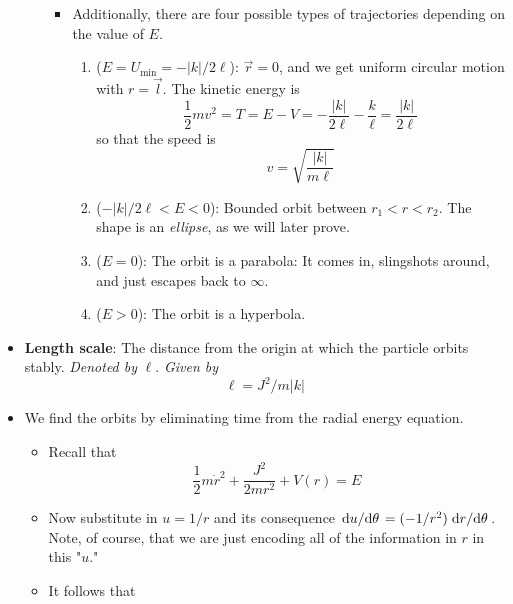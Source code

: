\documentclass[../notes.tex]{subfiles}
\begin{document}
\begin{itemize}
\begin{itemize}
\begin{itemize}
            \item Additionally, there are four possible types of trajectories depending on the value of $E$.
            \begin{enumerate}
                \item ($E=U_\text{min}=-|k|/2\ell$): $\vec{r}=0$, and we get uniform circular motion with $r=\vec{l}$. The kinetic energy is
                \begin{equation*}
                    \frac{1}{2}mv^2 = T
                    = E-V
                    = -\frac{|k|}{2\ell}-\frac{k}{\ell}
                    = \frac{|k|}{2\ell}
                \end{equation*}
                so that the speed is
                \begin{equation*}
                    v = \sqrt{\frac{|k|}{m\ell}}
                \end{equation*}
                \item ($-|k|/2\ell<E<0$): Bounded orbit between $r_1<r<r_2$. The shape is an \emph{ellipse}, as we will later prove.
                \item ($E=0$): The orbit is a parabola: It comes in, slingshots around, and just escapes back to $\infty$.
                \item ($E>0$): The orbit is a hyperbola.
            \end{enumerate}
        \end{itemize}
    \end{itemize}
    \item \textbf{Length scale}: The distance from the origin at which the particle orbits stably. \emph{Denoted by} $\bm{\ell}$. \emph{Given by}
    \begin{equation*}
        \ell = J^2/m|k|
    \end{equation*}
    \item We find the orbits by eliminating time from the radial energy equation.
    \begin{itemize}
        \item Recall that
        \begin{equation*}
            \frac{1}{2}m\dot{r}^2+\frac{J^2}{2mr^2}+V(r) = E
        \end{equation*}
        \item Now substitute in $u=1/r$ and its consequence $\dv*{u}{\theta}=(-1/r^2)\dv*{r}{\theta}$. Note, of course, that we are just encoding all of the information in $r$ in this "$u$."
        \item It follows that

\end{itemize}
\end{itemize}
\end{document}
